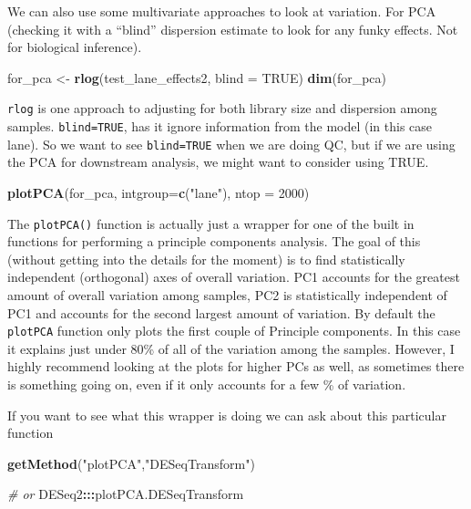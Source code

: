 \documentclass[
]{article}
\newenvironment{Shaded}{\begin{snugshade}}{\end{snugshade}}
\newcommand{\CommentTok}[1]{\textcolor[rgb]{0.56,0.35,0.01}{\textit{#1}}}
\newcommand{\DataTypeTok}[1]{\textcolor[rgb]{0.13,0.29,0.53}{#1}}
\newcommand{\DecValTok}[1]{\textcolor[rgb]{0.00,0.00,0.81}{#1}}
\newcommand{\KeywordTok}[1]{\textcolor[rgb]{0.13,0.29,0.53}{\textbf{#1}}}
\newcommand{\NormalTok}[1]{#1}
\newcommand{\OperatorTok}[1]{\textcolor[rgb]{0.81,0.36,0.00}{\textbf{#1}}}
\newcommand{\OtherTok}[1]{\textcolor[rgb]{0.56,0.35,0.01}{#1}}
\newcommand{\StringTok}[1]{\textcolor[rgb]{0.31,0.60,0.02}{#1}}
\begin{document}
We can also use some multivariate approaches to look at variation. For
PCA (checking it with a ``blind'' dispersion estimate to look for any
funky effects. Not for biological inference).

\begin{Shaded}
\begin{Highlighting}[]
\NormalTok{for_pca <-}\StringTok{ }\KeywordTok{rlog}\NormalTok{(test_lane_effects2, }
                \DataTypeTok{blind =} \OtherTok{TRUE}\NormalTok{)}
\KeywordTok{dim}\NormalTok{(for_pca)}
\end{Highlighting}
\end{Shaded}

\texttt{rlog} is one approach to adjusting for both library size and
dispersion among samples. \texttt{blind=TRUE}, has it ignore information
from the model (in this case lane). So we want to see
\texttt{blind=TRUE} when we are doing QC, but if we are using the PCA
for downstream analysis, we might want to consider using TRUE.

\begin{Shaded}
\begin{Highlighting}[]
\KeywordTok{plotPCA}\NormalTok{(for_pca, }
        \DataTypeTok{intgroup=}\KeywordTok{c}\NormalTok{(}\StringTok{"lane"}\NormalTok{),}
        \DataTypeTok{ntop =} \DecValTok{2000}\NormalTok{) }
\end{Highlighting}
\end{Shaded}

The \texttt{plotPCA()} function is actually just a wrapper for one of
the built in functions for performing a principle components analysis.
The goal of this (without getting into the details for the moment) is to
find statistically independent (orthogonal) axes of overall variation.
PC1 accounts for the greatest amount of overall variation among samples,
PC2 is statistically independent of PC1 and accounts for the second
largest amount of variation. By default the \texttt{plotPCA} function
only plots the first couple of Principle components. In this case it
explains just under 80\% of all of the variation among the samples.
However, I highly recommend looking at the plots for higher PCs as well,
as sometimes there is something going on, even if it only accounts for a
few \% of variation.

If you want to see what this wrapper is doing we can ask about this
particular function

\begin{Shaded}
\begin{Highlighting}[]
\KeywordTok{getMethod}\NormalTok{(}\StringTok{"plotPCA"}\NormalTok{,}\StringTok{"DESeqTransform"}\NormalTok{)}

\CommentTok{# or }
\NormalTok{DESeq2}\OperatorTok{:::}\NormalTok{plotPCA.DESeqTransform}
\end{Highlighting}
\end{Shaded}
\end{document}
